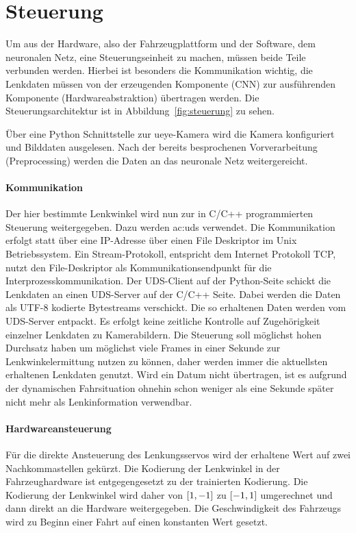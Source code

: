 \newpage

\section{Steuerung}

Um aus der Hardware, also der Fahrzeugplattform und der Software, dem neuronalen Netz, eine Steuerungseinheit zu machen, müssen beide Teile verbunden werden. Hierbei ist besonders die Kommunikation wichtig, die Lenkdaten müssen von der erzeugenden Komponente (CNN) zur ausführenden Komponente (Hardwareabstraktion) übertragen werden. Die Steuerungsarchitektur ist in Abbildung~\ref{fig:steuerung} zu sehen.

Über eine Python Schnittstelle zur ueye-Kamera wird die Kamera konfiguriert und Bilddaten ausgelesen. Nach der bereits besprochenen Vorverarbeitung (Preprocessing) werden die Daten an das neuronale Netz weitergereicht.

\paragraph{Kommunikation}
Der hier bestimmte Lenkwinkel wird nun zur in C/C++ programmierten Steuerung weitergegeben. Dazu werden \gls{ac:uds} verwendet. Die Kommunikation erfolgt statt über eine IP-Adresse über einen File Deskriptor im Unix Betriebssystem. Ein Stream-Protokoll, entspricht dem Internet Protokoll TCP, nutzt den File-Deskriptor als Kommunikationsendpunkt für die Interprozesskommunikation. Der UDS-Client auf der Python-Seite schickt die Lenkdaten an einen UDS-Server auf der C/C++ Seite. Dabei werden die Daten als UTF-8 kodierte Bytestreams verschickt. Die so erhaltenen Daten werden vom UDS-Server entpackt.
Es erfolgt keine zeitliche Kontrolle auf Zugehörigkeit einzelner Lenkdaten zu Kamerabildern. Die Steuerung soll möglichst hohen Durchsatz haben um möglichst viele Frames in einer Sekunde zur Lenkwinkelermittung nutzen zu können, daher werden immer die aktuellsten erhaltenen Lenkdaten genutzt. Wird ein Datum nicht übertragen, ist es aufgrund der dynamischen Fahrsituation ohnehin schon weniger als eine Sekunde später nicht mehr als Lenkinformation verwendbar.

\paragraph{Hardwareansteuerung}
Für die direkte Ansteuerung des Lenkungsservos wird der erhaltene Wert auf zwei Nachkommastellen gekürzt. Die Kodierung der Lenkwinkel in der Fahrzeughardware ist entgegengesetzt zu der trainierten Kodierung. Die Kodierung der Lenkwinkel wird daher von $\interval{1}{-1}$ zu $\interval{-1}{1}$ umgerechnet und dann direkt an die Hardware weitergegeben. 
Die Geschwindigkeit des Fahrzeugs wird zu Beginn einer Fahrt auf einen konstanten Wert gesetzt.

